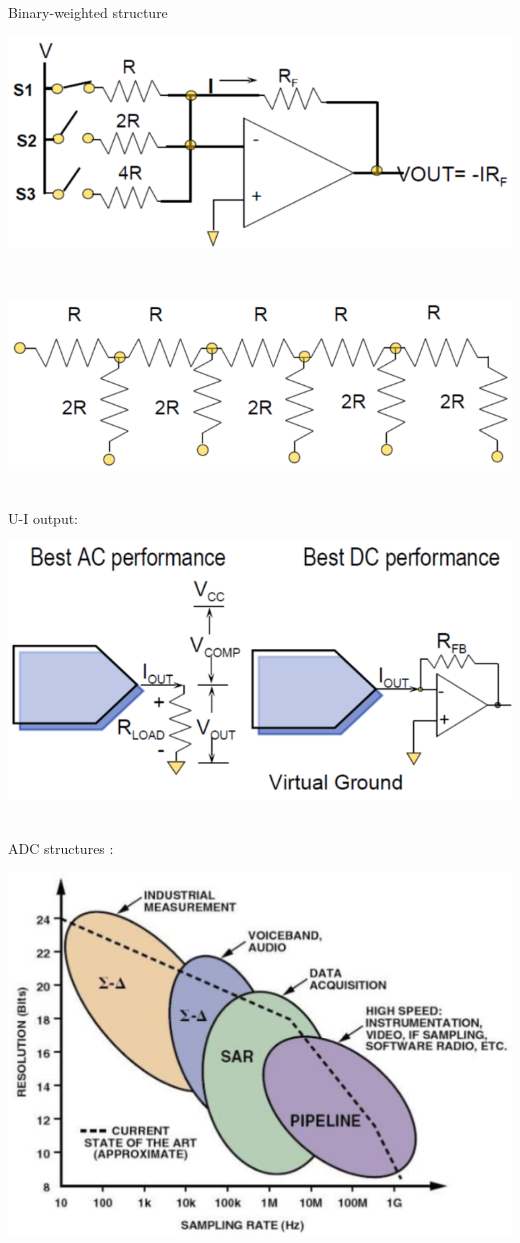 \documentclass[resume]{subfiles}
\begin{document}
\begin{multicols}{3}
Binary-weighted structure\\
\begin{minipage}{\linewidth}
	\centering
    \includegraphics[width =0.7\columnwidth]{an6.png}
\end{minipage}\\
\begin{minipage}{\linewidth}
	\centering
    \includegraphics[width =0.7\columnwidth]{an7.png}
\end{minipage}\\
U-I output:\\
\begin{minipage}{\linewidth}
	\centering
    \includegraphics[width =0.7\columnwidth]{an8.png}
\end{minipage}\\
ADC structures : \\
\begin{minipage}{\linewidth}
	\centering
    \includegraphics[width =0.7\columnwidth]{an9.png}

\end{minipage}
\end{multicols}
\end{document}
